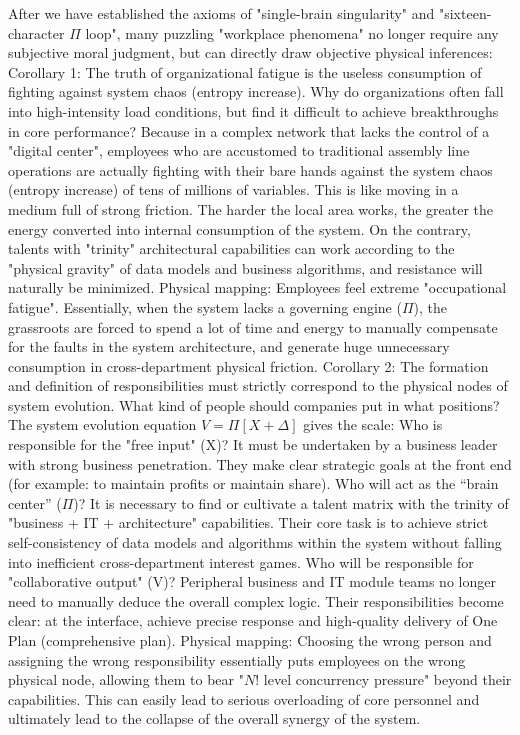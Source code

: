 \documentclass[11pt,a4paper]{article}
\begin{document}
After we have established the axioms of "single-brain singularity" and "sixteen-character $\Pi$ loop", many puzzling "workplace phenomena" no longer require any subjective moral judgment, but can directly draw objective physical inferences: Corollary 1: The truth of organizational fatigue is the useless consumption of fighting against system chaos (entropy increase). Why do organizations often fall into high-intensity load conditions, but find it difficult to achieve breakthroughs in core performance? Because in a complex network that lacks the control of a "digital center", employees who are accustomed to traditional assembly line operations are actually fighting with their bare hands against the system chaos (entropy increase) of tens of millions of variables. This is like moving in a medium full of strong friction. The harder the local area works, the greater the energy converted into internal consumption of the system. On the contrary, talents with "trinity" architectural capabilities can work according to the "physical gravity" of data models and business algorithms, and resistance will naturally be minimized. Physical mapping: Employees feel extreme "occupational fatigue". Essentially, when the system lacks a governing engine ($\Pi$), the grassroots are forced to spend a lot of time and energy to manually compensate for the faults in the system architecture, and generate huge unnecessary consumption in cross-department physical friction. Corollary 2: The formation and definition of responsibilities must strictly correspond to the physical nodes of system evolution. What kind of people should companies put in what positions? The system evolution equation $V = \Pi [ X + \Delta ]$ gives the scale: Who is responsible for the "free input" (X)? It must be undertaken by a business leader with strong business penetration. They make clear strategic goals at the front end (for example: to maintain profits or maintain share). Who will act as the “brain center” ($\Pi$)? It is necessary to find or cultivate a talent matrix with the trinity of "business + IT + architecture" capabilities. Their core task is to achieve strict self-consistency of data models and algorithms within the system without falling into inefficient cross-department interest games. Who will be responsible for "collaborative output" (V)? Peripheral business and IT module teams no longer need to manually deduce the overall complex logic. Their responsibilities become clear: at the interface, achieve precise response and high-quality delivery of One Plan (comprehensive plan). Physical mapping: Choosing the wrong person and assigning the wrong responsibility essentially puts employees on the wrong physical node, allowing them to bear "$N!$ level concurrency pressure" beyond their capabilities. This can easily lead to serious overloading of core personnel and ultimately lead to the collapse of the overall synergy of the system.
\end{document}
